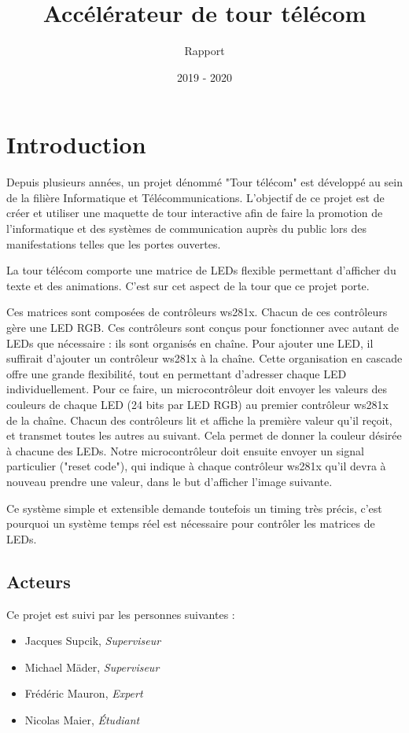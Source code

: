 \documentclass{HEIAarticle}
\title{Accélérateur de tour télécom}
\subtitle{Rapport}
\date{2019 - 2020}
\begin{document}
\maketitlepage

\makefullheader
\maketableofcontent

\chapter{Introduction}

Depuis plusieurs années, un projet dénommé "Tour télécom" est développé au sein de la filière Informatique et
Télécommunications. L'objectif de ce projet est de créer et utiliser une maquette de tour interactive afin de faire la promotion de l'informatique et des systèmes de communication auprès du public lors des manifestations telles que les portes ouvertes.

La tour télécom comporte une matrice de LEDs flexible permettant d'afficher du texte et des animations. C'est
sur cet aspect de la tour que ce projet porte.

Ces matrices sont composées de contrôleurs ws281x. Chacun de ces contrôleurs gère une LED RGB. Ces
contrôleurs sont conçus pour fonctionner avec autant de LEDs que nécessaire : ils sont organisés en chaîne. Pour
ajouter une LED, il suffirait d'ajouter un contrôleur ws281x à la chaîne. Cette organisation en cascade offre une
grande flexibilité, tout en permettant d'adresser chaque LED individuellement. Pour ce faire, un microcontrôleur
doit envoyer les valeurs des couleurs de chaque LED (24 bits par LED RGB) au premier contrôleur ws281x de la
chaîne. Chacun des contrôleurs lit et affiche la première valeur qu'il reçoit, et transmet toutes les autres au
suivant. Cela permet de donner la couleur désirée à chacune des LEDs. Notre microcontrôleur doit ensuite
envoyer un signal particulier ("reset code"), qui indique à chaque contrôleur ws281x qu'il devra à nouveau
prendre une valeur, dans le but d'afficher l'image suivante.

Ce système simple et extensible demande toutefois un timing très précis, c'est pourquoi un système temps réel
est nécessaire pour contrôler les matrices de LEDs.

\section{Acteurs}

Ce projet est suivi par les personnes suivantes :
\vspace{0.5em}
\begin{itemize}
    \item Jacques Supcik, \textit{Superviseur}
    \item Michael Mäder, \textit{Superviseur}
    \item Frédéric Mauron, \textit{Expert}
    \item Nicolas Maier, \textit{Étudiant}
\end{itemize}
\end{document}
